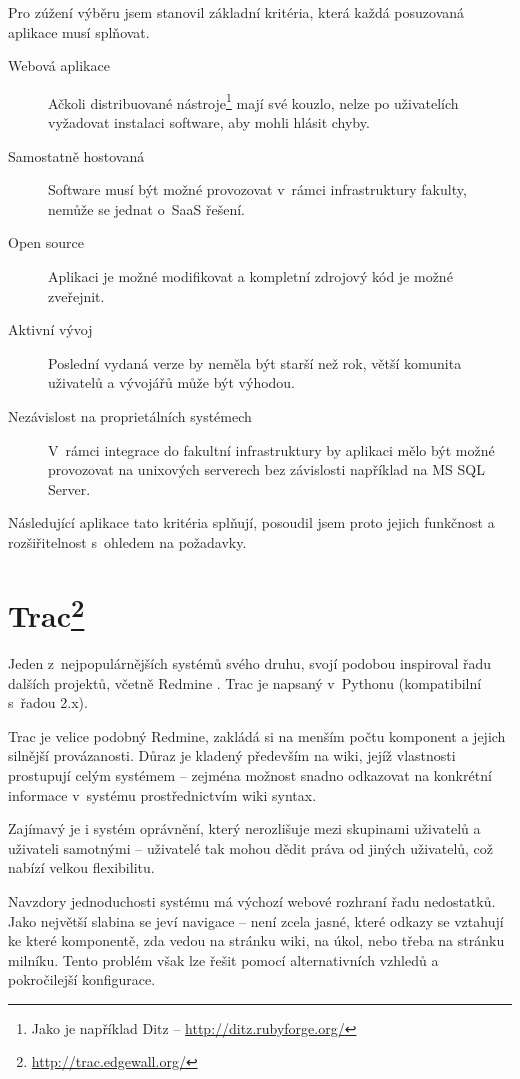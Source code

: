 \documentclass[thesis=B,czech]{FITthesis}[2012/05/02]
\begin{document}
Pro zúžení výběru jsem stanovil základní kritéria, která každá
posuzovaná aplikace musí splňovat.

\begin{description}
\item[Webová aplikace]
  Ačkoli distribuované nástroje\footnote{Jako je například Ditz -- \url{http://ditz.rubyforge.org/}} mají své kouzlo,
  nelze po uživatelích vyžadovat instalaci software, aby mohli hlásit
  chyby.
\item[Samostatně hostovaná]
  Software musí být možné provozovat v~rámci
  infrastruktury fakulty, nemůže se jednat o~\gls{SaaS} řešení.
\item[Open source]
  Aplikaci je možné modifikovat a kompletní zdrojový kód
  je možné zveřejnit.
\item[Aktivní vývoj]
  Poslední vydaná verze by neměla být starší než rok,
  větší komunita uživatelů a vývojářů může být výhodou.
\item[Nezávislost na proprietálních systémech]
  V~rámci integrace do
  fakultní infrastruktury by aplikaci mělo být možné provozovat na
  unixových serverech bez závislosti například na MS SQL Server.
\end{description}
Následující aplikace tato kritéria splňují, posoudil jsem proto jejich
funkčnost a rozšiřitelnost s~ohledem na požadavky.

\section[Trac]{Trac\footnote{\url{http://trac.edgewall.org/}}}

Jeden z~nejpopulárnějších systémů svého druhu, svojí podobou inspiroval
řadu dalších projektů, včetně Redmine \citep{TracRedMine}. Trac je
napsaný v~Pythonu (kompatibilní s~řadou 2.x).

Trac je velice podobný Redmine, zakládá si na menším počtu komponent a
jejich silnější provázanosti. Důraz je kladený především na wiki, jejíž
vlastnosti prostupují celým systémem -- zejména možnost snadno
odkazovat na konkrétní informace v~systému prostřednictvím wiki syntax.

Zajímavý je i systém oprávnění, který nerozlišuje mezi skupinami
uživatelů a uživateli samotnými -- uživatelé tak mohou dědit práva od
jiných uživatelů, což nabízí velkou flexibilitu.

Navzdory jednoduchosti systému má výchozí webové rozhraní řadu
nedostatků. Jako největší slabina se jeví navigace -- není zcela jasné,
které odkazy se vztahují ke které komponentě, zda vedou na stránku wiki,
na úkol, nebo třeba na stránku milníku. Tento problém však lze řešit
pomocí alternativních vzhledů a pokročilejší konfigurace.
\end{document}
